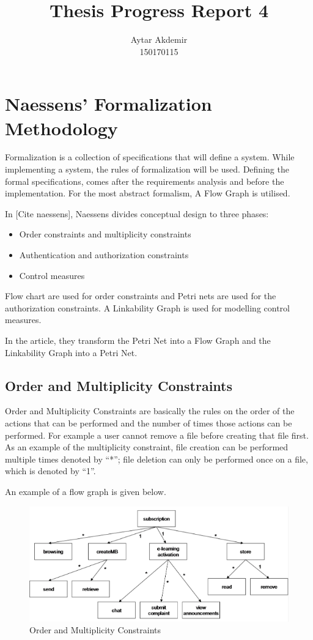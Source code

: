 \documentclass[11pt]{article} %
\title{Thesis Progress Report 4}
\author{Aytar Akdemir \\ 150170115}
\begin{document}
\maketitle

\section{Naessens' Formalization Methodology}

Formalization is a collection of specifications that will define a system.
While implementing a system, the rules of formalization will be used.
Defining the formal specifications, comes after the requirements analysis and before the implementation. 
For the most abstract formalism, A Flow Graph is utilised.



In [Cite naessens], Naessens divides conceptual design to three phases:

\begin{itemize}
\item Order constraints and multiplicity constraints
\item Authentication and authorization constraints
\item Control measures
\end{itemize}

Flow chart are used for order constraints and Petri nets are used for the authorization constraints. 
A Linkability Graph is used for modelling control measures.

In the article, they transform the Petri Net into a Flow Graph and the Linkability Graph into a Petri Net.


\subsection{Order and Multiplicity Constraints}

Order and Multiplicity Constraints are basically the rules on the order of the actions that can be performed and the number of times those actions can be performed. 
For example a user cannot remove a file before creating that file first. 
As an example of the multiplicity constraint, file creation can be performed multiple times denoted by ``*''; file deletion can only be performed once on a file, which is denoted by ``1''. 

An example of a flow graph is given below.

\begin{figure}[h!]
\includegraphics[width=\textwidth]{flow}
\caption{Order and Multiplicity Constraints}
\end{figure}
\end{document}
